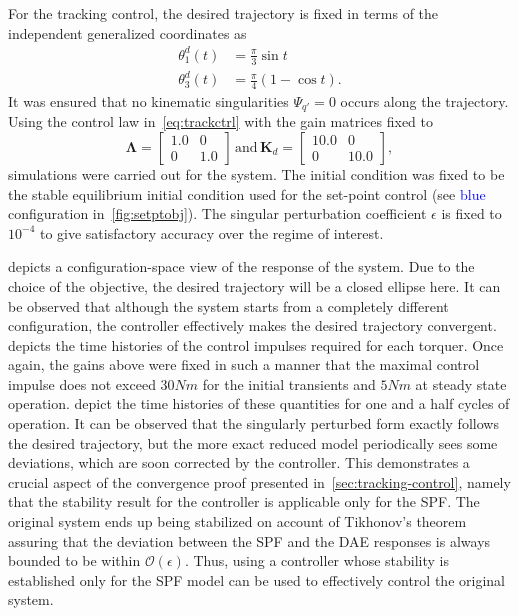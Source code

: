 \documentclass[10pt,final,journal,letterpaper,oneside,twocolumn]{IEEEtran}
\begin{document}
For the tracking control, the desired trajectory is fixed in terms of
the independent generalized coordinates as
\begin{align}
  \theta_1^d(t) &= \frac{\pi}{3}\sin t\nonumber\\
  \theta_3^d(t) &= \frac{\pi}{4}(1-\cos t)
  \label{eq:trackdes}.
\end{align}
It was ensured that no kinematic singularities $\Psi_{q'}=0$ occurs
along the trajectory. Using the control law in~\cref{eq:trackctrl}
with the gain matrices fixed to
\begin{equation}
  \label{eq:trackgains}
  \bm{\Lambda} = \begin{bmatrix} 1.0 & 0\\0 & 1.0 \end{bmatrix}\,
  \text{and}\,
  \bm{K}_d = \begin{bmatrix} 10.0 & 0\\0 & 10.0 \end{bmatrix},
\end{equation}
simulations were carried out for the system. The initial condition was
fixed to be the stable equilibrium initial condition used for the
set-point control (see \textcolor{blue}{blue} configuration
in~\cref{fig:setptobj}). The singular perturbation coefficient
$\epsilon$ is fixed to $10^{-4}$ to give satisfactory accuracy over
the regime of interest. 

 depicts a configuration-space view of the response
of the system. Due to the choice of the objective, the desired
trajectory will be a closed ellipse here. It can be observed that
although the system starts from a completely different configuration,
the controller effectively makes the desired trajectory
convergent.  depicts the time histories of the
control impulses required for each torquer. Once again, the gains
above were fixed in such a manner that the maximal control impulse
does not exceed $30 Nm$ for the initial transients and $5Nm$ at steady
state operation.  depict the time
histories of these quantities for one and a half cycles of
operation. It can be observed that the singularly perturbed form
exactly follows the desired trajectory, but the more exact reduced
model periodically sees some deviations, which are soon corrected by
the controller. This demonstrates a crucial aspect of the convergence
proof presented in~\cref{sec:tracking-control}, namely that the
stability result for the controller is applicable only for the
SPF. The original system ends up being stabilized on account of
Tikhonov's theorem assuring that the deviation between the SPF and the
DAE responses is always bounded to be within
$\mathcal{O}(\epsilon)$. Thus, using a controller whose stability is
established only for the SPF model can be used to effectively control
the original system.
\end{document}
